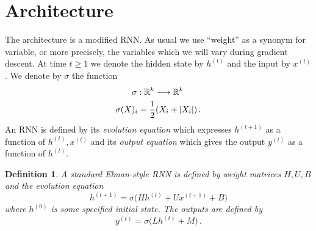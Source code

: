 \documentclass[english,letter paper,12pt,leqno]{article}
\theoremstyle{example}
\newtheorem{definition}[theorem]{Definition}
\numberwithin{equation}{section}
\def\be{\begin{equation}}
\def\ee{\end{equation}}
\begin{document}
\section{Architecture}

The architecture is a modified RNN. As usual we use ``weight'' as a synonym for variable, or more precisely, the variables which we will vary during gradient descent. At time $t \ge 1$ we denote the hidden state by $h^{(t)}$ and the input by $x^{(t)}$. We denote by $\sigma$ the function
\begin{gather*}
\sigma: \mathbb{R}^k \longrightarrow \mathbb{R}^k\,\\
\sigma( X )_i = \frac{1}{2}( X_i + |X_i| )\,.
\end{gather*}
An RNN is defined by its \emph{evolution equation} which expresses $h^{(t+1)}$ as a function of $h^{(t)}, x^{(t)}$ and its \emph{output equation} which gives the output $y^{(t)}$ as a function of $h^{(t)}$.

\begin{definition} A standard Elman-style RNN \cite{elman} is defined by weight matrices $H, U, B$ and the evolution equation
\be\label{eq:update_eqn}
h^{(t+1)} = \sigma\big( H h^{(t)} + U x^{(t+1)} + B\big)
\ee
where $h^{(0)}$ is some specified initial state. The outputs are defined by
\be\label{eq:output_rnn}
y^{(t)} = \sigma\big( L h^{(t)} + M \big)\,.
\ee
\end{definition}
\end{document}
